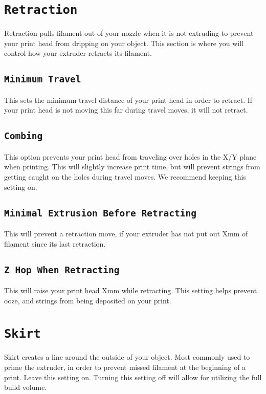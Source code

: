 \section{\texttt{Retraction}}
Retraction pulls filament out of your nozzle when it is not extruding to prevent your print head from dripping on your object. This section is where you will control how your extruder retracts its filament.

\subsection{\texttt{Minimum Travel}}
This sets the minimum travel distance of your print head in order to retract. If your print head is not moving this far during travel moves, it will not retract.

\subsection{\texttt{Combing}}
This option prevents your print head from traveling over holes in the X/Y plane when printing. This will slightly increase print time, but will prevent strings from getting caught on the holes during travel moves. We recommend keeping this setting on.

\subsection{\texttt{Minimal Extrusion Before Retracting}}
This will prevent a retraction move, if your extruder has not put out Xmm of filament since its last retraction.

\subsection{\texttt{Z Hop When Retracting}}
This will raise your print head Xmm while retracting. This setting helps prevent ooze, and strings from being deposited on your print. 

\section{\texttt{Skirt}}
Skirt creates a line around the outside of your object. Most commonly used to prime the extruder, in order to prevent missed filament at the beginning of a print. Leave this setting on. Turning this setting off will allow for utilizing the full build volume.

